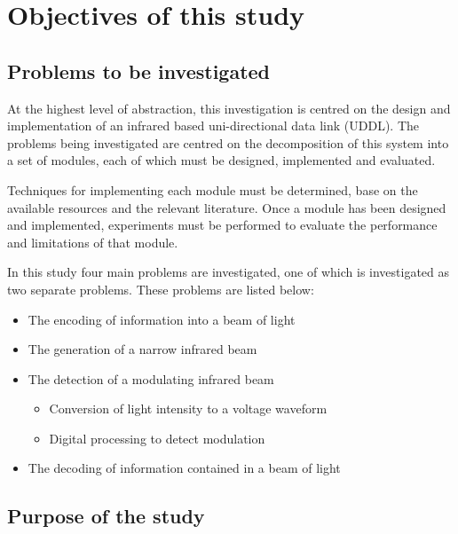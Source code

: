 \section{Objectives of this study}

\subsection{Problems to be investigated}

At the highest level of abstraction, this investigation is centred on the design and implementation of an infrared based uni-directional data link (UDDL). The problems being investigated are centred on the decomposition of this system into a set of modules, each of which must be designed, implemented and evaluated.

Techniques for implementing each module must be determined, base on the available resources and the relevant literature. Once a module has been designed and implemented, experiments must be performed to evaluate the performance and limitations of that module.

In this study four main problems are investigated, one of which is investigated as two separate problems. These problems are listed below:
\begin{itemize}
	\item The encoding of information into a beam of light
	\item The generation of a narrow infrared beam
	\item The detection of a modulating infrared beam
	\begin{itemize}
		\item Conversion of light intensity to a voltage waveform
		\item Digital processing to detect modulation
	\end{itemize}	
	\item The decoding of information contained in a beam of light
\end{itemize}






\subsection{Purpose of the study}

